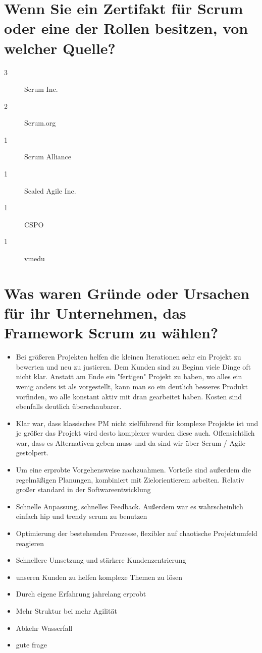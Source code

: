 \section*{Wenn Sie ein Zertifakt für Scrum oder eine der Rollen besitzen, von welcher Quelle?}
\begin{description}
    \item[3 \responsecount] Scrum Inc.
    \item[2 \responsecount] Scrum.org
    \item[1 \responsecount] Scrum Alliance
    \item[1 \responsecount] Scaled Agile Inc.
    \item[1 \responsecount] CSPO
    \item[1 \responsecount] vmedu
\end{description}

\section*{Was waren Gründe oder Ursachen für ihr Unternehmen, das Framework Scrum zu wählen?}
\begin{itemize}
    \item[\openresponse] Bei größeren Projekten helfen die kleinen Iterationen sehr ein Projekt zu bewerten und neu zu justieren. Dem Kunden sind zu Beginn viele Dinge oft nicht klar. Anstatt am Ende ein "fertigen" Projekt zu haben, wo alles ein wenig anders ist als vorgestellt, kann man so ein deutlich besseres Produkt vorfinden, wo alle konstant aktiv mit dran gearbeitet haben. Kosten sind ebenfalls deutlich überschaubarer.
    \item[\openresponse] Klar war, dass klassisches PM nicht zielführend für komplexe Projekte ist und je größer das Projekt wird desto komplexer wurden diese auch. Offensichtlich war, dass es Alternativen geben muss und da sind wir über Scrum / Agile gestolpert.
    \item[\openresponse] Um eine erprobte Vorgehensweise nachzuahmen. Vorteile sind außerdem die regelmäßigen Planungen, kombiniert mit Zielorientierem arbeiten. Relativ großer standard in der Softwareentwicklung
    \item[\openresponse] Schnelle Anpassung, schnelles Feedback. Außerdem war es wahrscheinlich einfach hip und trendy scrum zu benutzen
    \item[\openresponse] Optimierung der bestehenden Prozesse, flexibler auf chaotische Projektumfeld reagieren
    \item[\openresponse] Schnellere Umsetzung und stärkere Kundenzentrierung
    \item[\openresponse] unseren Kunden zu helfen komplexe Themen zu lösen
    \item[\openresponse] Durch eigene Erfahrung jahrelang erprobt
    \item[\openresponse] Mehr Struktur bei mehr Agilität
    \item[\openresponse] Abkehr Wasserfall
    \item[\openresponse] gute frage
\end{itemize}

